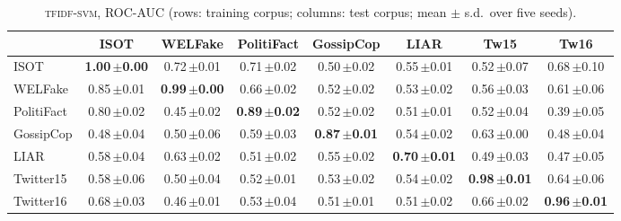 \begin{table}[h]
\centering
\caption{\textsc{tfidf-svm}, ROC-AUC (rows: training corpus; columns: test corpus; mean $\pm$ s.d.\ over five seeds).}
\scriptsize
\begin{tabular}{@{}lccccccc@{}}
\toprule
 & ISOT & WELFake & PolitiFact & GossipCop & LIAR & Tw15 & Tw16 \\
\midrule
ISOT & \textbf{1.00\,{\tiny$\pm$0.00}} & 0.72\,{\tiny$\pm$0.01} & 0.71\,{\tiny$\pm$0.02} & 0.50\,{\tiny$\pm$0.02} & 0.55\,{\tiny$\pm$0.01} & 0.52\,{\tiny$\pm$0.07} & 0.68\,{\tiny$\pm$0.10} \\
WELFake & 0.85\,{\tiny$\pm$0.01} & \textbf{0.99\,{\tiny$\pm$0.00}} & 0.66\,{\tiny$\pm$0.02} & 0.52\,{\tiny$\pm$0.02} & 0.53\,{\tiny$\pm$0.02} & 0.56\,{\tiny$\pm$0.03} & 0.61\,{\tiny$\pm$0.06} \\
PolitiFact & 0.80\,{\tiny$\pm$0.02} & 0.45\,{\tiny$\pm$0.02} & \textbf{0.89\,{\tiny$\pm$0.02}} & 0.52\,{\tiny$\pm$0.02} & 0.51\,{\tiny$\pm$0.01} & 0.52\,{\tiny$\pm$0.04} & 0.39\,{\tiny$\pm$0.05} \\
GossipCop & 0.48\,{\tiny$\pm$0.04} & 0.50\,{\tiny$\pm$0.06} & 0.59\,{\tiny$\pm$0.03} & \textbf{0.87\,{\tiny$\pm$0.01}} & 0.54\,{\tiny$\pm$0.02} & 0.63\,{\tiny$\pm$0.00} & 0.48\,{\tiny$\pm$0.04} \\
LIAR & 0.58\,{\tiny$\pm$0.04} & 0.63\,{\tiny$\pm$0.02} & 0.51\,{\tiny$\pm$0.02} & 0.55\,{\tiny$\pm$0.02} & \textbf{0.70\,{\tiny$\pm$0.01}} & 0.49\,{\tiny$\pm$0.03} & 0.47\,{\tiny$\pm$0.05} \\
Twitter15 & 0.58\,{\tiny$\pm$0.06} & 0.50\,{\tiny$\pm$0.04} & 0.52\,{\tiny$\pm$0.01} & 0.53\,{\tiny$\pm$0.02} & 0.54\,{\tiny$\pm$0.02} & \textbf{0.98\,{\tiny$\pm$0.01}} & 0.64\,{\tiny$\pm$0.06} \\
Twitter16 & 0.68\,{\tiny$\pm$0.03} & 0.46\,{\tiny$\pm$0.01} & 0.53\,{\tiny$\pm$0.04} & 0.51\,{\tiny$\pm$0.01} & 0.51\,{\tiny$\pm$0.02} & 0.66\,{\tiny$\pm$0.02} & \textbf{0.96\,{\tiny$\pm$0.01}} \\
\bottomrule
\end{tabular}
\end{table}

